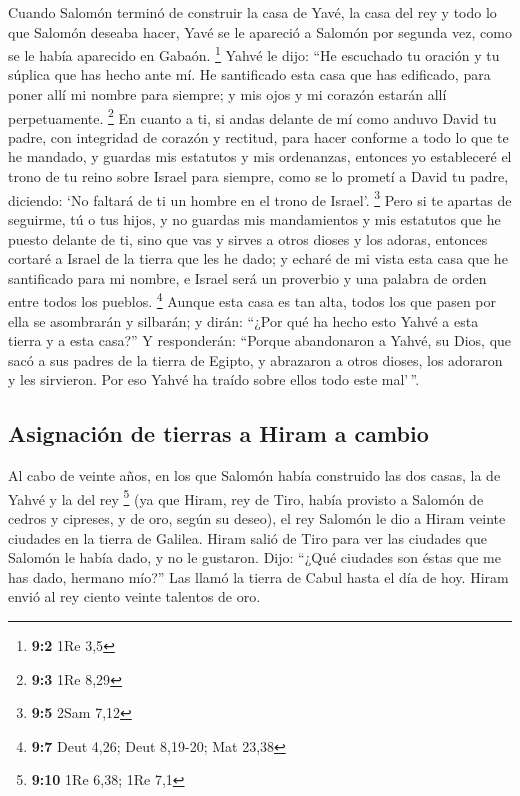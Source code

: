 \begin{paracol}{2}
 Cuando Salomón terminó de construir la casa de Yavé, la
casa del rey y todo lo que Salomón deseaba hacer,  Yavé se
le apareció a Salomón por segunda vez, como se le había aparecido en
Gabaón. \footnote{\textbf{9:2} 1Re 3,5}  Yahvé le dijo:
``He escuchado tu oración y tu súplica que has hecho ante mí. He
santificado esta casa que has edificado, para poner allí mi nombre para
siempre; y mis ojos y mi corazón estarán allí perpetuamente. \footnote{\textbf{9:3}
  1Re 8,29}  En cuanto a ti, si andas delante de mí como
anduvo David tu padre, con integridad de corazón y rectitud, para hacer
conforme a todo lo que te he mandado, y guardas mis estatutos y mis
ordenanzas,  entonces yo estableceré el trono de tu reino
sobre Israel para siempre, como se lo prometí a David tu padre,
diciendo: `No faltará de ti un hombre en el trono de Israel'.
\footnote{\textbf{9:5} 2Sam 7,12}  Pero si te apartas de
seguirme, tú o tus hijos, y no guardas mis mandamientos y mis estatutos
que he puesto delante de ti, sino que vas y sirves a otros dioses y los
adoras,  entonces cortaré a Israel de la tierra que les he
dado; y echaré de mi vista esta casa que he santificado para mi nombre,
e Israel será un proverbio y una palabra de orden entre todos los
pueblos. \footnote{\textbf{9:7} Deut 4,26; Deut 8,19-20; Mat 23,38}
 Aunque esta casa es tan alta, todos los que pasen por
ella se asombrarán y silbarán; y dirán: ``¿Por qué ha hecho esto Yahvé a
esta tierra y a esta casa?''  Y responderán: ``Porque
abandonaron a Yahvé, su Dios, que sacó a sus padres de la tierra de
Egipto, y abrazaron a otros dioses, los adoraron y les sirvieron. Por
eso Yahvé ha traído sobre ellos todo este mal'\,''.

\hypertarget{asignaciuxf3n-de-tierras-a-hiram-a-cambio}{%
\subsection{Asignación de tierras a Hiram a
cambio}\label{asignaciuxf3n-de-tierras-a-hiram-a-cambio}}

 Al cabo de veinte años, en los que Salomón había
construido las dos casas, la de Yahvé y la del rey \footnote{\textbf{9:10}
  1Re 6,38; 1Re 7,1}  (ya que Hiram, rey de Tiro, había
provisto a Salomón de cedros y cipreses, y de oro, según su deseo), el
rey Salomón le dio a Hiram veinte ciudades en la tierra de Galilea.
 Hiram salió de Tiro para ver las ciudades que Salomón le
había dado, y no le gustaron.  Dijo: ``¿Qué ciudades son
éstas que me has dado, hermano mío?'' Las llamó la tierra de Cabul hasta
el día de hoy.  Hiram envió al rey ciento veinte talentos
de oro.


\end{paracol}
